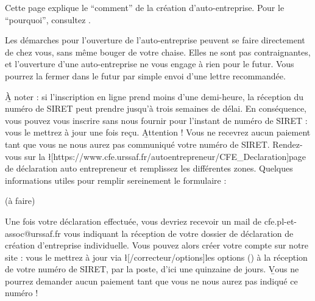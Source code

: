 ﻿Cette page explique le “comment” de la création d'auto-entreprise. Pour le “pourquoi”, consultez .

Les démarches pour l'ouverture de l'auto-entreprise peuvent se faire directement de chez vous, sans même bouger de votre chaise.
Elles ne sont pas contraignantes, et l'ouverture d'une auto-entreprise ne vous engage à rien pour le futur. Vous pourrez la fermer dans le futur par simple envoi d'une lettre recommandée.

\b{À noter} : si l'inscription en ligne prend moins d'une demi-heure, la réception du numéro de SIRET peut prendre jusqu'à trois semaines de délai. En conséquence, vous pouvez vous inscrire sans nous fournir pour l'instant de numéro de SIRET : vous le mettrez à jour une fois reçu. \b{Attention !} Vous ne recevrez aucun paiement tant que vous ne nous aurez pas communiqué votre numéro de SIRET.
Rendez-vous sur la \l[https://www.cfe.urssaf.fr/autoentrepreneur/CFE_Declaration]{page de déclaration auto entrepreneur} et remplissez les différentes zones. Quelques informations utiles pour remplir sereinement le formulaire :
\begin{itemize}
	\li (à faire)
\end{itemize}

Une fois votre déclaration effectuée, vous devriez recevoir un mail de cfe.pl-et-assoc@urssaf.fr vous indiquant la réception de votre dossier de déclaration de création d'entreprise individuelle.
Vous pouvez alors créer votre compte sur notre site : vous le mettrez à jour via \l[/correcteur/options]{les options} () à la réception de votre numéro de SIRET, par la poste, d'ici une quinzaine de jours. \b{Vous ne pourrez demander aucun paiement tant que vous ne nous aurez pas indiqué ce numéro} !